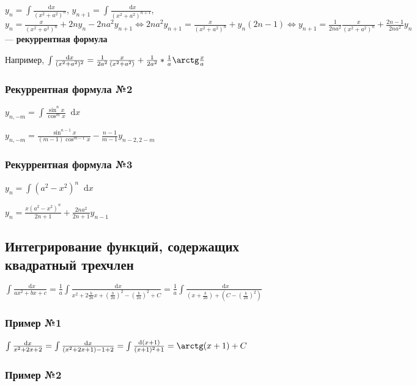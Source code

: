 \documentclass{article}
\newcommand*\diff{\mathop{}\!\mathrm{d}}
\begin{document}
\hfill 

$y_n = \int \frac{\diff x}{(x^2 + a^2)^{n}}$, $y_{n + 1} = \int \frac{\diff x}{(x^2 + a^2)^{n + 1}}$, $y_n = \frac{x}{(x^2 + a^2)^{n}} + 2 n y_n - 2 n a ^2 y_{n + 1} \Longleftrightarrow 2 n a^2 y_{n + 1} = \frac{x}{(x^2 + a^2)^{n}} + y_n (2 n - 1) \Longleftrightarrow y_{n + 1} = \frac{1}{2 n a^2} \frac{x}{(x^2 + a^2)^{n}} + \frac{2 n - 1}{2 n a^2} y_n$ — \textbf{рекуррентная формула}

\hfill

Например, $\int \frac{\diff x}{(x^2 + a^2)^{2}} = \frac{1}{2 a^2} \frac{x}{(x^2 + a^2)} + \frac{1}{2a^2} * \frac{1}{a} \arctg \frac{x}{a}$

\subsubsection{Рекуррентная формула №2}

$y_{n, - m} = \int \frac{\sin^{n} x}{\cos^{m} x} \diff x$

$y_{n, - m} = \frac{\sin^{n - 1} x}{(m - 1) \cos^{m - 1} x} - \frac{n - 1}{m - 1} y_{n - 2, 2 - m}$

\subsubsection{Рекуррентная формула №3}

$y_{n} = \int (a^2 - x^2)^{n} \diff x$

$y_{n} = \frac{x (a^2 - x^2)^{n}}{2 n + 1} + \frac{2 n a^2}{2 n + 1} y_{n - 1}$

\subsection{Интегрирование функций, содержащих квадратный трехчлен}

$\int \frac{\diff x}{a x^2 + b x + c} = \frac{1}{a} \int \frac{\diff x}{x^2 + 2 \frac{b}{2 a} x + (\frac{b}{2 a})^2 - (\frac{b}{2 a})^2 + C} = \frac{1}{a} \int \frac{\diff x}{(x + \frac{b}{2 a}) + (C - (\frac{b}{2 a})^2)}$

\subsubsection{Пример №1}

$\int \frac{\diff x}{x^2 + 2x + 2} = \int \frac{\diff x}{(x^2 + 2 x + 1) - 1 + 2} = \int \frac{\diff (x + 1)}{(x + 1)^2 + 1} = \arctg (x + 1) + C$

\subsubsection{Пример №2}
\end{document}
